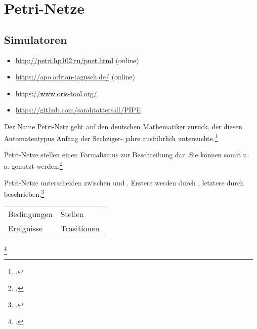\documentclass{lehramt-informatik-haupt}
\begin{document}
\def\TmpBeschriftung#1{%
  {%
    \footnotesize%
    \itshape#1%
  }%
}


\chapter{Petri-Netze}

\begin{liQuellen}
\item \cite[Seite 238-242]{hoffmann}
\end{liQuellen}

\section{Simulatoren}

\begin{itemize}
\item \url{http://petri.hp102.ru/pnet.html} (online)
\item \url{https://apo.adrian-jagusch.de/} (online)
\item \url{https://www.oris-tool.org/}
\item \url{https://github.com/sarahtattersall/PIPE}
\end{itemize}

\noindent
Der Name Petri-Netz geht auf den deutschen Mathematiker  zurück, der diesen Automatentypus Anfang der Sechziger- jahre
ausführlich untersuchte.\footcite[Seite 238]{hoffmann}

Petri-Netze stellen einen Formalismus zur Beschreibung
 dar.
%
Sie können somit u.\,a. 
genutzt werden.\footcite{sosy:fs:3}

Petri-Netze unterscheiden zwischen  und
. Erstere werden durch , letztere
durch  beschrieben.\footcite[Seite 238]{hoffmann}

\begin{center}
\begin{tabular}{l|l}
Bedingungen & Stellen \\
Ereignisse & Trasitionen \\
\end{tabular}\footcite[Seite 238]{hoffmann}
\end{center}
\end{document}
